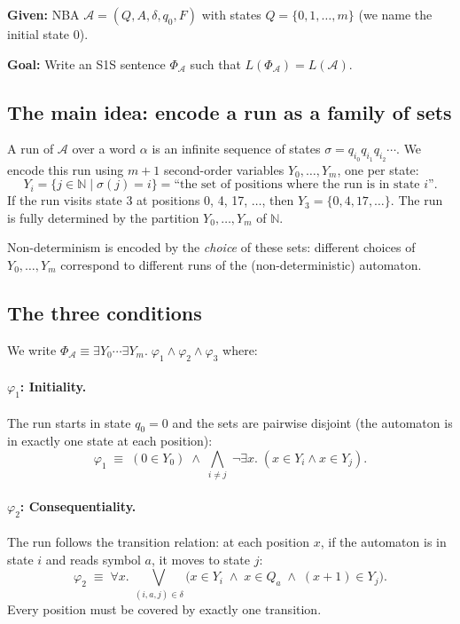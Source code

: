 \textbf{Given:} NBA $\mathcal{A} = (Q, A, \delta, q_0, F)$ with states
$Q = \{0, 1, \ldots, m\}$ (we name the initial state $0$).

\textbf{Goal:} Write an S1S sentence $\Phi_{\mathcal{A}}$ such that
$L(\Phi_{\mathcal{A}}) = L(\mathcal{A})$.

\subsection{The main idea: encode a run as a family of sets}

A run of $\mathcal{A}$ over a word $\alpha$ is an infinite sequence of
states $\sigma = q_{i_0} q_{i_1} q_{i_2} \cdots$.  We encode this run
using $m+1$ second-order variables $Y_0, \ldots, Y_m$, one per state:
\[
  Y_i = \{j \in \mathbb{N} \mid \sigma(j) = i\}
      = \text{``the set of positions where the run is in state } i\text{''}.
\]
If the run visits state 3 at positions 0, 4, 17, $\ldots$, then
$Y_3 = \{0, 4, 17, \ldots\}$.  The run is fully determined by the
partition $Y_0, \ldots, Y_m$ of $\mathbb{N}$.

Non-determinism is encoded by the \emph{choice} of these sets: different
choices of $Y_0, \ldots, Y_m$ correspond to different runs of the
(non-deterministic) automaton.

\subsection{The three conditions}

We write $\Phi_{\mathcal{A}} \equiv \exists Y_0 \cdots \exists Y_m.\;
\varphi_1 \land \varphi_2 \land \varphi_3$ where:

\paragraph{$\varphi_1$: Initiality.}
The run starts in state $q_0 = 0$ and the sets are pairwise disjoint
(the automaton is in exactly one state at each position):
\[
  \varphi_1 \;\equiv\;
  (0 \in Y_0) \;\land\;
  \bigwedge_{i \neq j}\; \neg\exists x.\;(x \in Y_i \land x \in Y_j).
\]

\paragraph{$\varphi_2$: Consequentiality.}
The run follows the transition relation: at each position $x$, if the
automaton is in state $i$ and reads symbol $a$, it moves to state $j$:
\[
  \varphi_2 \;\equiv\;
  \forall x.\;
  \bigvee_{(i,a,j) \in \delta}
    \bigl(x \in Y_i \;\land\; x \in Q_a \;\land\; (x+1) \in Y_j\bigr).
\]
Every position must be covered by exactly one transition.

